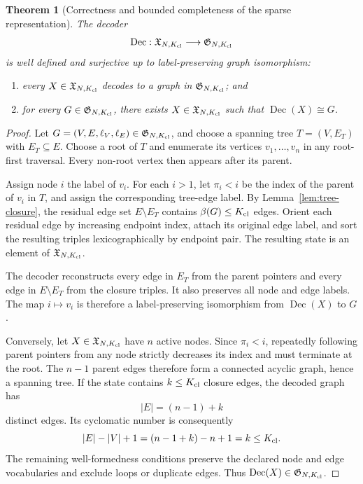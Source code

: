 \documentclass{article}
\newtheorem{theorem}{Theorem}[section]
\begin{document}
\begin{theorem}[Correctness and bounded completeness of the sparse representation]
\label{thm:bounded-representation}
The decoder
\begin{equation}
    \operatorname{Dec}:
    \mathfrak{X}_{N,K_{\rm cl}}
    \longrightarrow
    \mathfrak{G}_{N,K_{\rm cl}}
\end{equation}
is well defined and surjective up to label-preserving graph isomorphism:
\begin{enumerate}
    \item every $X\in\mathfrak{X}_{N,K_{\rm cl}}$ decodes to a graph in
    $\mathfrak{G}_{N,K_{\rm cl}}$; and
    \item for every $G\in\mathfrak{G}_{N,K_{\rm cl}}$, there exists
    $X\in\mathfrak{X}_{N,K_{\rm cl}}$ such that $\operatorname{Dec}(X)\cong G$.
\end{enumerate}
\end{theorem}

\begin{proof}
Let $G=(V,E,\ell_V,\ell_E)\in\mathfrak{G}_{N,K_{\rm cl}}$, and choose a spanning tree
$T=(V,E_T)$ with $E_T\subseteq E$.
Choose a root of $T$ and enumerate its vertices $v_1,\ldots,v_n$ in any root-first traversal.
Every non-root vertex then appears after its parent.

Assign node $i$ the label of $v_i$.
For each $i>1$, let $\pi_i<i$ be the index of the parent of $v_i$ in $T$, and assign the
corresponding tree-edge label.
By Lemma~\ref{lem:tree-closure}, the residual edge set $E\setminus E_T$ contains
$\beta(G)\leq K_{\rm cl}$ edges.
Orient each residual edge by increasing endpoint index, attach its original edge label, and sort the
resulting triples lexicographically by endpoint pair.
The resulting state is an element of $\mathfrak{X}_{N,K_{\rm cl}}$.

The decoder reconstructs every edge in $E_T$ from the parent pointers and every edge in
$E\setminus E_T$ from the closure triples.
It also preserves all node and edge labels.
The map $i\mapsto v_i$ is therefore a label-preserving isomorphism from
$\operatorname{Dec}(X)$ to $G$.

Conversely, let $X\in\mathfrak{X}_{N,K_{\rm cl}}$ have $n$ active nodes.
Since $\pi_i<i$, repeatedly following parent pointers from any node strictly decreases its index and
must terminate at the root.
The $n-1$ parent edges therefore form a connected acyclic graph, hence a spanning tree.
If the state contains $k\leq K_{\rm cl}$ closure edges, the decoded graph has
\begin{equation}
    |E|=(n-1)+k
\end{equation}
distinct edges.
Its cyclomatic number is consequently
\begin{equation}
    |E|-|V|+1
    =
    (n-1+k)-n+1
    =
    k
    \leq K_{\rm cl}.
\end{equation}
The remaining well-formedness conditions preserve the declared node and edge vocabularies and
exclude loops or duplicate edges.
Thus $\operatorname{Dec}(X)\in\mathfrak{G}_{N,K_{\rm cl}}$.
\end{proof}
\end{document}
